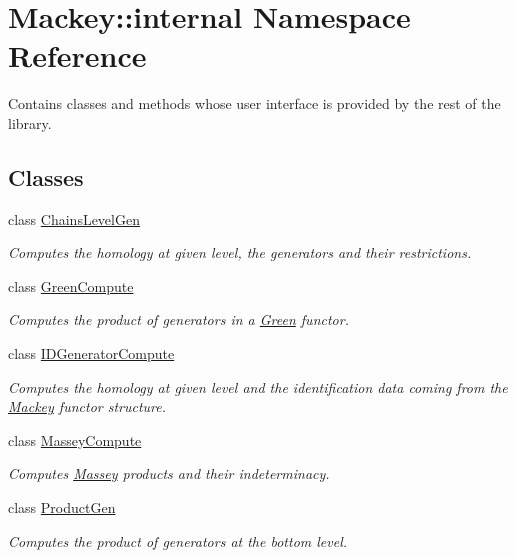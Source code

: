 \hypertarget{namespaceMackey_1_1internal}{}\section{Mackey\+:\+:internal Namespace Reference}
\label{namespaceMackey_1_1internal}


Contains classes and methods whose user interface is provided by the rest of the library.  


\subsection*{Classes}
\begin{DoxyCompactItemize}
\item 
class \hyperlink{classMackey_1_1internal_1_1ChainsLevelGen}{Chains\+Level\+Gen}
\begin{DoxyCompactList}\small\item\em Computes the homology at given level, the generators and their restrictions. \end{DoxyCompactList}\item 
class \hyperlink{classMackey_1_1internal_1_1GreenCompute}{Green\+Compute}
\begin{DoxyCompactList}\small\item\em Computes the product of generators in a \hyperlink{classMackey_1_1Green}{Green} functor. \end{DoxyCompactList}\item 
class \hyperlink{classMackey_1_1internal_1_1IDGeneratorCompute}{I\+D\+Generator\+Compute}
\begin{DoxyCompactList}\small\item\em Computes the homology at given level and the identification data coming from the \hyperlink{namespaceMackey}{Mackey} functor structure. \end{DoxyCompactList}\item 
class \hyperlink{classMackey_1_1internal_1_1MasseyCompute}{Massey\+Compute}
\begin{DoxyCompactList}\small\item\em Computes \hyperlink{classMackey_1_1Massey}{Massey} products and their indeterminacy. \end{DoxyCompactList}\item 
class \hyperlink{classMackey_1_1internal_1_1ProductGen}{Product\+Gen}
\begin{DoxyCompactList}\small\item\em Computes the product of generators at the bottom level. \end{DoxyCompactList}\end{DoxyCompactItemize}
